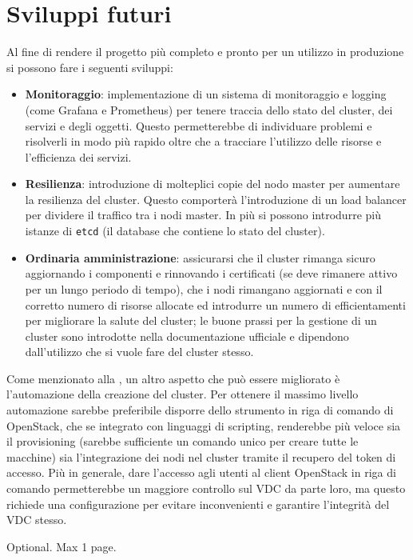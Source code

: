 \documentclass[12pt,a4paper,openright,twoside]{book}
\begin{document}
\section{Sviluppi futuri}
\label{sec:future}
Al fine di rendere il progetto più completo e pronto per un utilizzo in produzione si possono fare i seguenti sviluppi:
\begin{itemize}
    \item {\textbf{Monitoraggio}: implementazione di un sistema di monitoraggio e logging (come Grafana e Prometheus) per tenere traccia dello stato del cluster, dei servizi e degli oggetti.
    Questo permetterebbe di individuare problemi e risolverli in modo più rapido oltre che a tracciare l'utilizzo delle risorse e l'efficienza dei servizi.
    }
    \item{
        \textbf{Resilienza}: introduzione di molteplici copie del nodo master per aumentare la resilienza del cluster. Questo comporterà l'introduzione di un load balancer per dividere il traffico tra i nodi master.
        In più si possono introdurre più istanze di \texttt{etcd} (il database che contiene lo stato del cluster)\cite{kubernetes}.
    }
    \item {
        \textbf{Ordinaria amministrazione}: assicurarsi che il cluster rimanga sicuro aggiornando i componenti e rinnovando i certificati (se deve rimanere
        attivo per un lungo periodo di tempo), che i nodi rimangano aggiornati e con il corretto numero di risorse allocate ed introdurre un numero di efficientamenti
        per migliorare la salute del cluster; le buone prassi per la gestione di un cluster sono introdotte nella documentazione ufficiale e dipendono dall'utilizzo che
        si vuole fare del cluster stesso\cite{kubernetes}.
    }
\end{itemize}
Come menzionato alla , un altro aspetto che può essere migliorato è l'automazione della creazione del cluster.
Per ottenere il massimo livello automazione sarebbe preferibile disporre dello strumento in riga di comando di OpenStack, che se integrato con linguaggi di scripting, renderebbe 
più veloce sia il provisioning (sarebbe sufficiente un comando unico per creare tutte le macchine) sia l'integrazione dei nodi nel cluster tramite il recupero del token di accesso.
Più in generale, dare l'accesso agli utenti al client OpenStack in riga di comando permetterebbe un maggiore controllo sul VDC da parte loro, ma questo richiede una configurazione
per evitare inconvenienti e garantire l'integrità del VDC stesso.


\backmatter

\nocite{*} %




\begin{acknowledgements} %
Optional. Max 1 page.
\end{acknowledgements}
\end{document}
